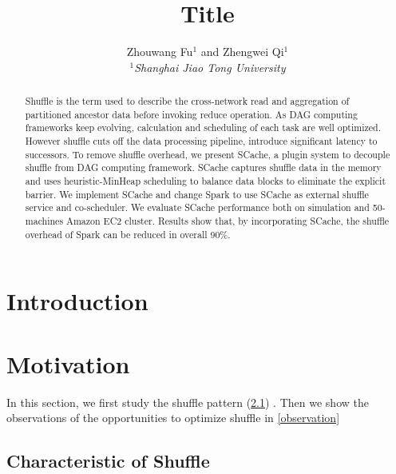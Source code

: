 \documentclass[10pt,twocolumn]{article}
\begin{document}
\title{Title}
\author{Zhouwang Fu$^1$ and Zhengwei Qi$^1$ \\
\small {\em  $^1$Shanghai Jiao Tong University} \\ [2mm]
}
\date{}
\maketitle

\begin{abstract}

Shuffle is the term used to describe the cross-network read and aggregation of partitioned ancestor data before invoking reduce operation.
As DAG computing frameworks keep evolving, calculation and scheduling of each task are well optimized. 
However shuffle cuts off the data processing pipeline, introduce significant latency to successors.
To remove shuffle overhead, we present SCache, a plugin system to decouple shuffle from DAG computing framework. SCache captures shuffle data in the memory and uses heuristic-MinHeap scheduling to balance data blocks to eliminate the explicit barrier. We implement SCache and change Spark to use SCache as external shuffle service and co-scheduler. We evaluate SCache performance both on simulation and 50-machines Amazon EC2 cluster.
Results show that, by incorporating SCache, the shuffle overhead of Spark can be reduced in overall 90\%.

\end{abstract}

\section{Introduction}

\section{Motivation}

In this section, we first study the shuffle pattern (\ref{shuffle pattern}) . 
Then we show the observations of the opportunities to optimize shuffle in \ref{observation}
\subsection{Characteristic of Shuffle} \label{shuffle pattern}
\end{document}
